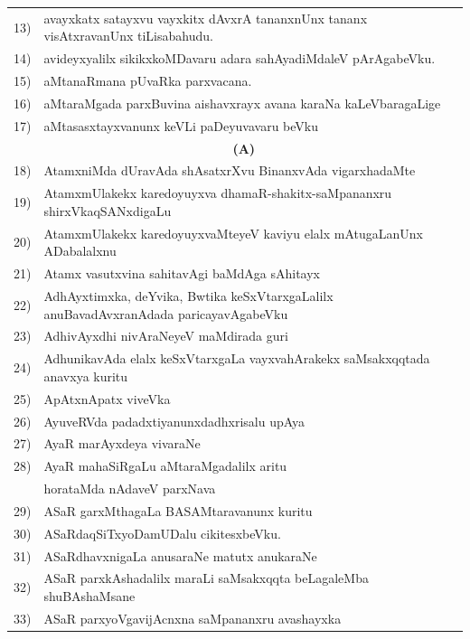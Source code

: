 \begin{longtable}{@{}cp{7.4cm}r}
13) & avayxkatx satayxvu vayxkitx dAvxrA tananxnUnx tananx visAtxravanUnx tiLisabahudu. & \pageref{page108}\\
14) & avideyxyalilx sikikxkoMDavaru adara sahAyadiMdaleV pArAgabeVku. &\pageref{page160}\\
15) & aMtanaRmana pUvaRka parxvacana. & \pageref{page83b}\\
16) & aMtaraMgada parxBuvina aishavxrayx avana karaNa kaLeVbaragaLige  & \pageref{page190a}\\
17) & aMtasasxtayxvanunx keVLi paDeyuvavaru beVku & \pageref{page108a}\\ 
    &   \multicolumn{1}{c}{\textbf{(A)}} & \\    
18) & AtamxniMda dUravAda shAsatxrXvu BinanxvAda vigarxhadaMte &   \pageref{page188}\\
19) & AtamxmUlakekx karedoyuyxva dhamaR-shakitx-saMpananxru shirxVkaqSANxdigaLu &   \pageref{page237a}\\
20) & AtamxmUlakekx karedoyuyxvaMteyeV kaviyu elalx mAtugaLanUnx ADabalalxnu &   \pageref{page237}\\
21) & Atamx vasutxvina sahitavAgi baMdAga sAhitayx & \pageref{page196}\\
22) & AdhAyxtimxka, deYvika, Bwtika keSxVtarxgaLalilx anuBavadAvxranAdada paricayavAgabeVku & \pageref{page172b}\\
23) & AdhivAyxdhi nivAraNeyeV maMdirada guri & \pageref{page67}\\
24) & AdhunikavAda elalx keSxVtarxgaLa vayxvahArakekx saMsakxqqtada anavxya kuritu & \pageref{page36b}\\
25) & ApAtxnApatx viveVka & \pageref{page173}\\
26) & AyuveRVda padadxtiyanunxdadhxrisalu upAya & \pageref{page50b}\\
27) & AyaR marAyxdeya vivaraNe & \pageref{page90}\\
28) & AyaR mahaSiRgaLu aMtaraMgadalilx aritu &   \\
    & horataMda nAdaveV parxNava   & \pageref{page138a}\\
29) & ASaR garxMthagaLa BASAMtaravanunx kuritu  & \pageref{page30c}\\
30) & ASaRdaqSiTxyoDamUDalu cikitesxbeVku. & \pageref{page61}\\
31) & ASaRdhavxnigaLa anusaraNe matutx anukaraNe & \pageref{page120a}\\
32) & ASaR parxkAshadalilx maraLi saMsakxqqta beLagaleMba shuBAshaMsane & \pageref{page62a}\\
33) & ASaR parxyoVgavijAcnxna saMpananxru avashayxka & \pageref{page54}\\

\end{longtable}
